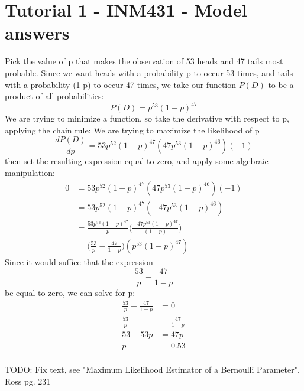 \documentclass{article}
\begin{document}
\section*{Tutorial 1 - INM431 - Model answers}
Pick the value of p that makes the observation of 53 heads and 47 tails most probable.   
Since we want heads with a probability p to occur 53 times, and tails with a probability (1-p) to occur 47 times, we take our function $P(D)$  to be a product of all probabilities:
\begin{equation}
    P(D) = p^{53}(1-p)^{47}
\end{equation}
We are trying to minimize a function, so take the derivative with respect to p, applying the chain rule:
We are trying to maximize the likelihood of p
$$
\frac{dP(D)}{dp}=53p^{52}(1-p)^{47}(47p^{53}(1-p)^{46})(-1)
$$
then set the resulting expression equal to zero, and apply some algebraic manipulation:
\begin{align*}
0 & = 53p^{52}(1-p)^{47}(47p^{53}(1-p)^{46})(-1)  \\
& = 53p^{52}(1-p)^{47}(-47p^{53}(1-p)^{46}) \\
& = \frac{53p^{53}(1-p)^{47}}{p}\Bigg(\frac{-47p^{53}(1-p)^{47}}{(1-p)}\Bigg) \\
& = \Bigg(\frac{53}{p}-\frac{47}{1-p}\Bigg)(p^{53}(1-p)^{47})
\end{align*}
Since it would suffice that the expression
$$
\frac{53}{p}-\frac{47}{1-p}
$$
be equal to zero, we can solve for p:
\begin{align*}
\frac{53}{p}-\frac{47}{1-p} & = 0 \\
\frac{53}{p} & = \frac{47}{1-p} \\
53 - 53p & = 47p \\
p & = 0.53 \\
\end{align*}

TODO: Fix text, see "Maximum Likelihood Estimator of a Bernoulli Parameter", Ross pg. 231

 
\end{document}
